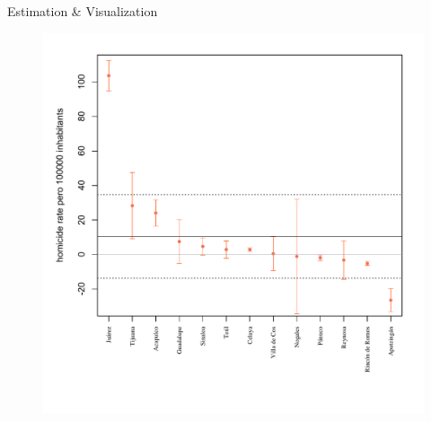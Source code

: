 \documentclass[final]{beamer}
\newlength{\onecolwid}
\newlength{\threecolwid}
\begin{document}
\begin{frame}[t]
\begin{columns}[t]
\begin{column}{\threecolwid}
\begin{block}{Estimation \& Visualization}
\begin{figure}[htdp]
{					   	\includegraphics[scale=1.1]{../Images/results.pdf}
					}
			\end{figure}
			
	

				
	 \end{block}
      \begin{columns}[t,totalwidth=\threecolwid]	%
        \begin{column}{\onecolwid}


\end{column}
\end{columns}
\end{column}
\end{columns}
\end{frame}
\end{document}
